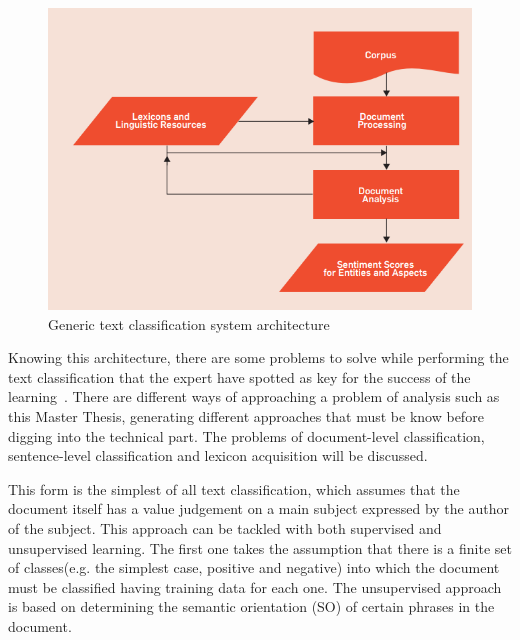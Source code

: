 \begin{figure}[!htp]
    \centering
    \includegraphics[scale=0.85]{img/state-of-art/text-classification-architecture.png}

    \caption{Generic text classification system architecture~\cite{feldman2013techniques}}
    \label{fig:text-clasification-architecture}
\end{figure}


Knowing this architecture, there are some problems to solve while performing the text classification that the expert have spotted as key for the success of the learning~\cite{feldman2013techniques}. There are different ways of approaching a problem of analysis such as this Master Thesis, generating different approaches that must be know before digging into the technical part. The problems of document-level classification, sentence-level classification and lexicon acquisition will be discussed.

This form is the simplest of all text classification, which assumes that the document itself has a value judgement on a main subject expressed by the author of the subject. This approach can be tackled with both supervised and unsupervised learning. The first one takes the assumption that there is a finite set of classes(e.g. the simplest case, positive and negative) into which the document must be classified having training data for each one. The unsupervised approach is based on determining the semantic orientation (SO) of certain phrases in the document.

